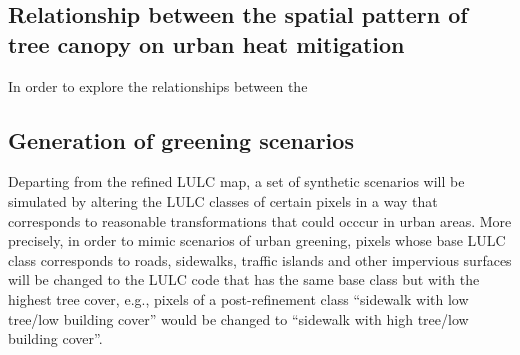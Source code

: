 \documentclass[10pt,letterpaper]{article}
\begin{document}
\subsection*{Relationship between the spatial pattern of tree canopy on urban heat mitigation}

In order to explore the relationships between the \cite{rey2010pysal}



\subsection*{Generation of greening scenarios}

Departing from the refined LULC map, a set of synthetic scenarios will be simulated by altering the LULC classes of certain pixels in a way that corresponds to reasonable transformations that could occcur in urban areas.
More precisely, in order to mimic scenarios of urban greening, pixels whose base LULC class corresponds to roads, sidewalks, traffic islands and other impervious surfaces will be changed to the LULC code that has the same base class but with the highest tree cover, e.g.,  pixels of a post-refinement class ``sidewalk with low tree/low building cover'' would be changed to ``sidewalk with high tree/low building cover''.
\end{document}
